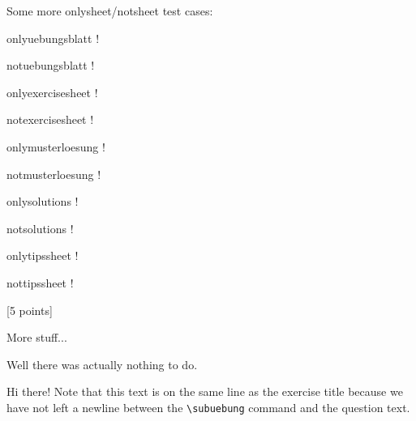 \documentclass[11pt,a4paper]{article}
\begin{document}
Some more onlysheet/notsheet test cases:
\begin{onlyuebungsblatt}
  \par onlyuebungsblatt !
\end{onlyuebungsblatt}
\begin{notuebungsblatt}
  \par notuebungsblatt !
\end{notuebungsblatt}
\begin{onlyexercisesheet}
  \par onlyexercisesheet !
\end{onlyexercisesheet}
\begin{notexercisesheet}
  \par notexercisesheet !
\end{notexercisesheet}
\begin{onlymusterloesung}
  \par onlymusterloesung !
\end{onlymusterloesung}
\begin{notmusterloesung}
  \par notmusterloesung !
\end{notmusterloesung}
\begin{onlysolutions}
  \par onlysolutions !
\end{onlysolutions}
\begin{notsolutions}
  \par notsolutions !
\end{notsolutions}
\begin{onlytipssheet}
  \par onlytipssheet !
\end{onlytipssheet}
\begin{nottipssheet}
  \par nottipssheet !
\end{nottipssheet}



[5 points]

More stuff...

\begin{solution}
  Well there was actually nothing to do.
\end{solution}


Hi there! Note that this text is on the same line as the exercise title because we have
not left a newline between the \texttt{\textbackslash subuebung} command and the question
text.
\end{document}
